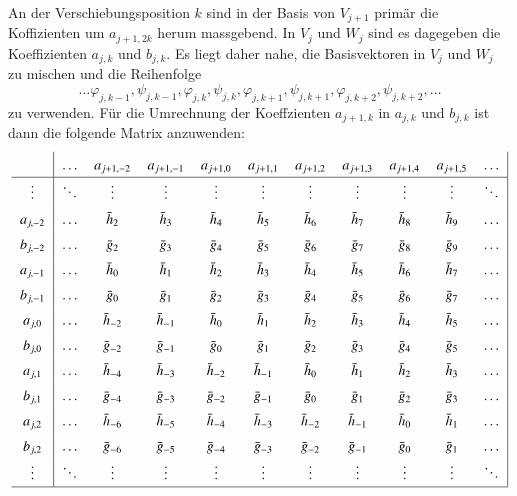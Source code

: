 An der Verschiebungsposition $k$ sind in der Basis von $V_{j+1}$ 
primär die Koffizienten um $a_{j+1,2k}$ herum massgebend.
In $V_j$ und $W_j$ sind es dagegeben die Koeffizienten $a_{j,k}$ und
$b_{j,k}$.
Es liegt daher nahe, die Basisvektoren in $V_j$ und $W_j$ zu mischen
und die Reihenfolge
\[
\dots    
\varphi_{j,k-1},\psi_{j,k-1},
\varphi_{j,k},\psi_{j,k},
\varphi_{j,k+1},\psi_{j,k+1},
\varphi_{j,k+2},\psi_{j,k+2},
\dots
\]
zu verwenden.
Für die Umrechnung der Koeffzienten $a_{j+1,k}$ in $a_{j,k}$ und $b_{j,k}$
ist dann die folgende Matrix anzuwenden:
\begin{equation}
\bgroup
\def\arraystretch{1.5}
\begin{tabular}{>{$}c<{$}|
>{$}c<{$}
>{$}c<{$}
>{$}c<{$}
>{$}c<{$}
>{$}c<{$}
>{$}c<{$}
>{$}c<{$}
>{$}c<{$}
>{$}c<{$}
>{$}c<{$}|}
        &\dots &a_{j+1,-2}  &a_{j+1,-1}  &a_{j+1,0}   &a_{j+1,1}   &a_{j+1,2}   &a_{j+1,3}   &a_{j+1,4}&a_{j+1,5}&\dots \\
\hline
\vdots  &\ddots&\vdots      &\vdots      &\vdots      &\vdots      &\vdots      &\vdots      &\vdots   &\vdots   &\ddots\\
a_{j,-2}&\dots &\bar{h}_2   &\bar{h}_3   &\bar{h}_4   &\bar{h}_5   &\bar{h}_6   &\bar{h}_7   &\bar{h}_8&\bar{h}_9&\dots \\
b_{j,-2}&\dots &\bar{g}_2   &\bar{g}_3   &\bar{g}_4   &\bar{g}_5   &\bar{g}_6   &\bar{g}_7   &\bar{g}_8&\bar{g}_9&\dots \\
a_{j,-1}&\dots &\bar{h}_0   &\bar{h}_1   &\bar{h}_2   &\bar{h}_3   &\bar{h}_4   &\bar{h}_5   &\bar{h}_6&\bar{h}_7&\dots \\
b_{j,-1}&\dots &\bar{g}_0   &\bar{g}_1   &\bar{g}_2   &\bar{g}_3   &\bar{g}_4   &\bar{g}_5   &\bar{g}_6&\bar{g}_7&\dots \\
a_{j, 0}&\dots &\bar{h}_{-2}&\bar{h}_{-1}&\bar{h}_0   &\bar{h}_1   &\bar{h}_2   &\bar{h}_3   &\bar{h}_4&\bar{h}_5&\dots \\
b_{j, 0}&\dots &\bar{g}_{-2}&\bar{g}_{-1}&\bar{g}_0   &\bar{g}_1   &\bar{g}_2   &\bar{g}_3   &\bar{g}_4&\bar{g}_5&\dots \\
a_{j, 1}&\dots &\bar{h}_{-4}&\bar{h}_{-3}&\bar{h}_{-2}&\bar{h}_{-1}&\bar{h}_0   &\bar{h}_1   &\bar{h}_2&\bar{h}_3&\dots \\
b_{j, 1}&\dots &\bar{g}_{-4}&\bar{g}_{-3}&\bar{g}_{-2}&\bar{g}_{-1}&\bar{g}_0   &\bar{g}_1   &\bar{g}_2&\bar{g}_3&\dots \\
a_{j, 2}&\dots &\bar{h}_{-6}&\bar{h}_{-5}&\bar{h}_{-4}&\bar{h}_{-3}&\bar{h}_{-2}&\bar{h}_{-1}&\bar{h}_0&\bar{h}_1&\dots \\
b_{j, 2}&\dots &\bar{g}_{-6}&\bar{g}_{-5}&\bar{g}_{-4}&\bar{g}_{-3}&\bar{g}_{-2}&\bar{g}_{-1}&\bar{g}_0&\bar{g}_1&\dots \\
\vdots  &\ddots&\vdots      &\vdots      &\vdots      &\vdots      &\vdots      &\vdots      &\vdots   &\vdots   &\ddots\\
\hline
\end{tabular}
\egroup
\label{fast:transmatrix}
\end{equation}
%
%
